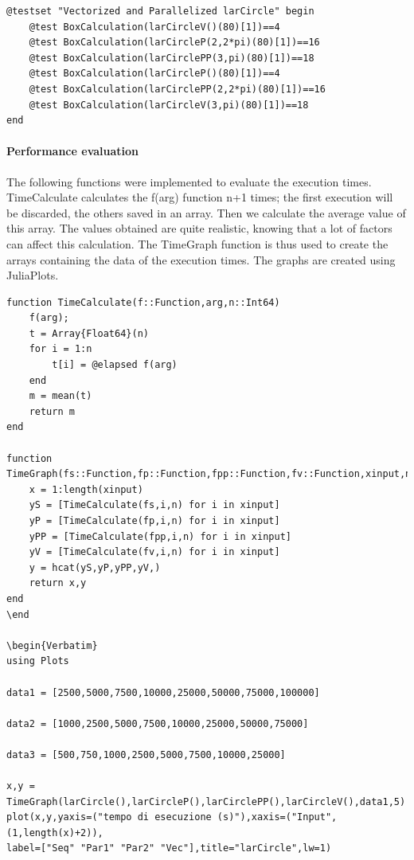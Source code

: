 \documentclass{article}
\begin{document}
\begin{Verbatim}
@testset "Vectorized and Parallelized larCircle" begin
    @test BoxCalculation(larCircleV()(80)[1])==4
    @test BoxCalculation(larCircleP(2,2*pi)(80)[1])==16
    @test BoxCalculation(larCirclePP(3,pi)(80)[1])==18
    @test BoxCalculation(larCircleP()(80)[1])==4
    @test BoxCalculation(larCirclePP(2,2*pi)(80)[1])==16
    @test BoxCalculation(larCircleV(3,pi)(80)[1])==18
end
\end{Verbatim}

\paragraph{Performance evaluation\\}

The following functions were implemented to evaluate the execution times.
TimeCalculate calculates the f(arg) function n+1 times; the first execution will be discarded, the others saved in an array. Then we calculate the average value of this array. The values obtained are quite realistic, knowing that a lot of factors can affect this calculation. The TimeGraph function is thus used to create the arrays containing the data of the execution times. The graphs are created using JuliaPlots.

\begin{Verbatim}
function TimeCalculate(f::Function,arg,n::Int64)
    f(arg);
    t = Array{Float64}(n)
    for i = 1:n
        t[i] = @elapsed f(arg)
    end
    m = mean(t)
    return m
end

function TimeGraph(fs::Function,fp::Function,fpp::Function,fv::Function,xinput,n::Int64)
    x = 1:length(xinput)
    yS = [TimeCalculate(fs,i,n) for i in xinput]
    yP = [TimeCalculate(fp,i,n) for i in xinput]
    yPP = [TimeCalculate(fpp,i,n) for i in xinput]
    yV = [TimeCalculate(fv,i,n) for i in xinput]
    y = hcat(yS,yP,yPP,yV,)
    return x,y
end
\end

\begin{Verbatim}
using Plots 

data1 = [2500,5000,7500,10000,25000,50000,75000,100000]

data2 = [1000,2500,5000,7500,10000,25000,50000,75000]

data3 = [500,750,1000,2500,5000,7500,10000,25000]

x,y = TimeGraph(larCircle(),larCircleP(),larCirclePP(),larCircleV(),data1,5)
plot(x,y,yaxis=("tempo di esecuzione (s)"),xaxis=("Input",(1,length(x)+2)),
label=["Seq" "Par1" "Par2" "Vec"],title="larCircle",lw=1)

\end{Verbatim}
\end{document}
